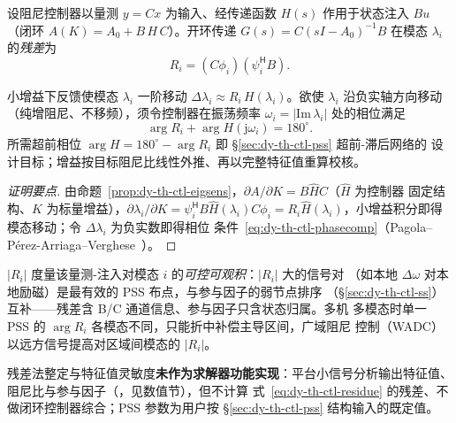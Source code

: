 \begin{definition}[模态残差]\label{def:dy-th-ctl-residue}
设阻尼控制器以量测 $y=Cx$ 为输入、经传递函数 $H(s)$ 作用于状态注入 $Bu$
（闭环 $A(K)=A_0+B\,H\,C$）。开环传递 $G(s)=C(sI-A_0)^{-1}B$ 在模态 $\lambda_i$
的\emph{残差}为
\begin{equation}
R_i=(C\phi_i)(\psi_i^{\mathsf H}B).
\label{eq:dy-th-ctl-residue}
\end{equation}
\end{definition}

\begin{theorem}[残差-相位补偿整定]\label{thm:dy-th-ctl-residue}
小增益下反馈使模态 $\lambda_i$ 一阶移动 $\Delta\lambda_i\approx R_i\,H(\lambda_i)$。欲使
$\lambda_i$ 沿负实轴方向移动（纯增阻尼、不移频），须令控制器在振荡频率
$\omega_i=|\mathrm{Im}\,\lambda_i|$ 处的相位满足
\begin{equation}
\arg R_i+\arg H(\mathrm j\omega_i)=180^\circ .
\label{eq:dy-th-ctl-phasecomp}
\end{equation}
所需超前相位 $\arg H=180^\circ-\arg R_i$ 即 §\ref{sec:dy-th-ctl-pss} 超前-滞后网络的
设计目标；增益按目标阻尼比线性外推、再以完整特征值重算校核。
\end{theorem}
\begin{proof}[证明要点]
由命题~\ref{prop:dy-th-ctl-eigsens}，$\partial A/\partial K=B\hat H C$（$\hat H$ 为控制器
固定结构、$K$ 为标量增益），$\partial\lambda_i/\partial K=\psi_i^{\mathsf H}B\hat H(\lambda_i)C\phi_i
=R_i\hat H(\lambda_i)$，小增益积分即得模态移动；令 $\Delta\lambda_i$ 为负实数即得相位
条件~\eqref{eq:dy-th-ctl-phasecomp}（Pagola--P\'erez-Arriaga--Verghese~\cite{ctl:pagola}）。
\end{proof}

\begin{remark}[选点与多模态权衡]\label{rem:dy-th-ctl-residue}
$|R_i|$ 度量该量测-注入对模态 $i$ 的\emph{可控可观积}：$|R_i|$ 大的信号对
（如本地 $\Delta\omega$ 对本地励磁）是最有效的 PSS 布点，与参与因子的弱节点排序
（§\ref{sec:dy-th-ctl-ss}）互补——残差含 B/C 通道信息、参与因子只含状态归属。多机
多模态时单一 PSS 的 $\arg R_i$ 各模态不同，只能折中补偿主导区间，广域阻尼
控制（WADC）以远方信号提高对区域间模态的 $|R_i|$。
\end{remark}

\begin{gapnote}
残差法整定与特征值灵敏度\textbf{未作为求解器功能实现}：平台小信号分析输出特征值、
阻尼比与参与因子（，见数值节），但不计算
式~\eqref{eq:dy-th-ctl-residue} 的残差、不做闭环控制器综合；PSS 参数为用户按
§\ref{sec:dy-th-ctl-pss} 结构输入的既定值。
\end{gapnote}


